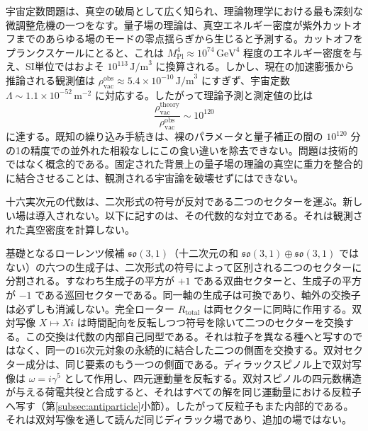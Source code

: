 \documentclass[a4paper]{article}
\begin{document}
宇宙定数問題は、真空の破局として広く知られ、理論物理学における最も深刻な微調整危機の一つをなす。量子場の理論は、真空エネルギー密度が紫外カットオフまでのあらゆる場のモードの零点揺らぎから生じると予測する。カットオフをプランクスケールにとると、これは \(M_\text{Pl}^4 \approx 10^{74}\,\text{GeV}^4\) 程度のエネルギー密度を与え、SI単位ではおよそ \(10^{113}\,\text{J/m}^3\) に換算される。しかし、現在の加速膨張から推論される観測値は \(\rho_\text{vac}^\text{obs} \approx 5.4 \times 10^{-10}\,\text{J/m}^3\) にすぎず、宇宙定数 \(\Lambda \sim 1.1 \times 10^{-52}\,\text{m}^{-2}\) に対応する。したがって理論予測と測定値の比は
\[
\frac{\rho_\text{vac}^\text{theory}}{\rho_\text{vac}^\text{obs}} \sim 10^{120}
\]
に達する。既知の繰り込み手続きは、裸のパラメータと量子補正の間の \(10^{120}\) 分の1の精度での並外れた相殺なしにこの食い違いを除去できない。問題は技術的ではなく概念的である。固定された背景上の量子場の理論の真空に重力を整合的に結合させることは、観測される宇宙論を破壊せずにはできない。

十六実次元の代数は、二次形式の符号が反対である二つのセクターを運ぶ。新しい場は導入されない。以下に記すのは、その代数的な対立である。それは観測された真空密度を計算しない。

基礎となるローレンツ候補 \(\mathfrak{so}(3,1)\)（十二次元の和 \(\mathfrak{so}(3,1)\oplus\mathfrak{so}(3,1)\) ではない）の六つの生成子は、二次形式の符号によって区別される二つのセクターに分割される。すなわち生成子の平方が \(+1\) である双曲セクターと、生成子の平方が \(-1\) である巡回セクターである。同一軸の生成子は可換であり、軸外の交換子は必ずしも消滅しない。完全ローター \(R_\text{total}\) は両セクターに同時に作用する。双対写像 \(X \mapsto Xi\) は時間配向を反転しつつ符号を除いて二つのセクターを交換する。この交換は代数の内部自己同型である。それは粒子を異なる種へと写すのではなく、同一の16次元対象の永続的に結合した二つの側面を交換する。双対セクター成分は、同じ要素のもう一つの側面である。ディラックスピノル上で双対写像は $\omega=i\gamma^5$ として作用し、四元運動量を反転する。双対スピノルの四元数構造が与える荷電共役と合成すると、それはすべての解を同じ運動量における反粒子へ写す（第\ref{subsec:antiparticle}小節）。したがって反粒子もまた内部的である。それは双対写像を通して読んだ同じディラック場であり、追加の場ではない。
\end{document}

